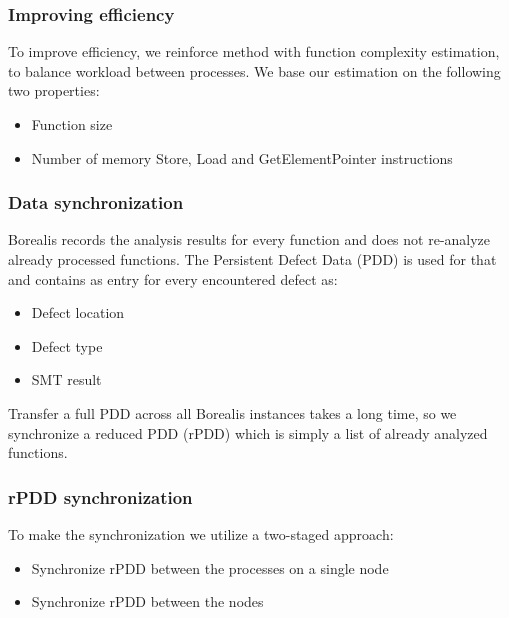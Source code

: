 
\begin{frame}
\frametitle{Improving efficiency}
To improve efficiency, we reinforce method with function complexity estimation, to balance workload between processes. We base our estimation on the following two properties:
	\begin{itemize}
		\item Function size
		\item Number of memory Store, Load and GetElementPointer instructions
	\end{itemize}
\end{frame}


\begin{frame}
\frametitle{Data synchronization}
Borealis records the analysis results for every function and does not re-analyze already processed functions. The Persistent Defect Data (PDD) is used for that and contains as entry for every encountered defect as:
	\begin{itemize}
		\item Defect location
		\item Defect type
		\item SMT result
	\end{itemize}
\begin{block}
	\centering
	Transfer a full PDD across all Borealis instances takes a long time, so we synchronize a reduced PDD (rPDD) which is simply a list of already analyzed functions.
\end{block}
\end{frame}


\begin{frame}
\frametitle{rPDD synchronization}
To make the synchronization we utilize a two-staged approach:
	\begin{itemize}
		\item Synchronize rPDD between the processes on a single node
		\item Synchronize rPDD between the nodes
\end{itemize}
\end{frame}

